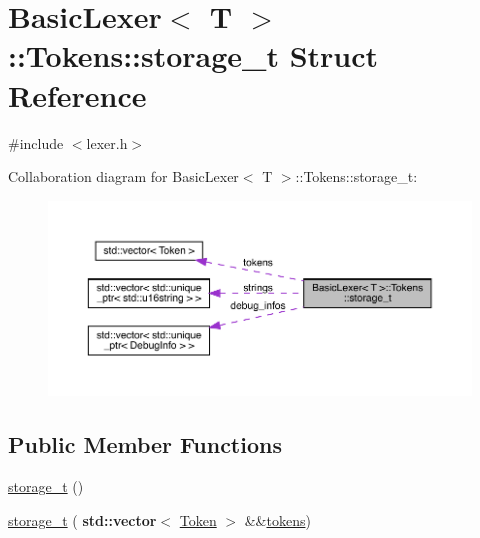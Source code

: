 \hypertarget{struct_basic_lexer_1_1_tokens_1_1storage__t}{}\section{Basic\+Lexer$<$ T $>$\+:\+:Tokens\+:\+:storage\+\_\+t Struct Reference}
\label{struct_basic_lexer_1_1_tokens_1_1storage__t}


{\ttfamily \#include $<$lexer.\+h$>$}



Collaboration diagram for Basic\+Lexer$<$ T $>$\+:\+:Tokens\+:\+:storage\+\_\+t\+:\nopagebreak
\begin{figure}[H]
\begin{center}
\leavevmode
\includegraphics[width=350pt]{struct_basic_lexer_1_1_tokens_1_1storage__t__coll__graph}
\end{center}
\end{figure}
\subsection*{Public Member Functions}
\begin{DoxyCompactItemize}
\item 
\hyperlink{struct_basic_lexer_1_1_tokens_1_1storage__t_a93eb78f3f158d806a2c02934bbdea859}{storage\+\_\+t} ()
\item 
\hyperlink{struct_basic_lexer_1_1_tokens_1_1storage__t_adc2ef25135af9c48c8694187fa39f527}{storage\+\_\+t} (\textbf{ std\+::vector}$<$ \hyperlink{class_token}{Token} $>$ \&\&\hyperlink{struct_basic_lexer_1_1_tokens_1_1storage__t_a5150826387fcf46d98647a4d4e3fc83f}{tokens})
\end{DoxyCompactItemize}
